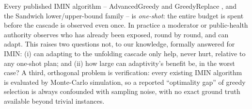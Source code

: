 \documentclass[ijoc,sglanonrev]{informs4}
\begin{document}
Every published IMIN algorithm -- AdvancedGreedy and GreedyReplace
\citep{xie2023,xie2024}, and the Sandwich lower/upper-bound family
\citep{wang2024sandwich} -- is \emph{one-shot}: the entire budget is spent
before the cascade is observed even once. In practice a moderator or
public-health authority observes who has already been exposed, round by
round, and can adapt. This raises two questions not, to our knowledge,
formally answered for IMIN: (i) can adapting to the unfolding cascade only
help, never hurt, relative to any one-shot plan; and (ii) how large can
adaptivity's benefit be, in the worst case? A third, orthogonal problem is
verification: every existing IMIN algorithm is evaluated by Monte-Carlo
simulation, so a reported ``optimality gap'' of greedy selection is
always confounded with sampling noise, with no exact ground truth
available beyond trivial instances.
\end{document}

